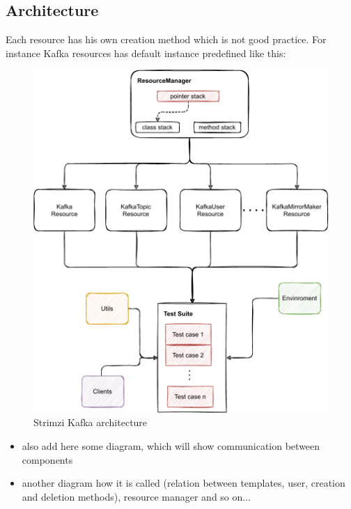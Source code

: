 \subsection{Architecture}
\label{02d-strimzi-architecture}

Each resource has his own creation method which is not good practice. For instance Kafka resources has default instance predefined like this:

\begin{figure}[!ht]
    \centering
    \includegraphics[scale=0.70]{obrazky-figures/02-preliminaries/04-strimzi-system-tests/01-architecture-overall.pdf}
    \caption{Strimzi Kafka architecture}
    \label{04:fig:strimzi}
\end{figure}

\begin{itemize}[itemsep=1mm, parsep=0pt]
    \item also add here some diagram, which will show communication between components
    \item another diagram how it is called (relation between templates, user, creation and deletion methods), resource manager and so on...
\end{itemize}

